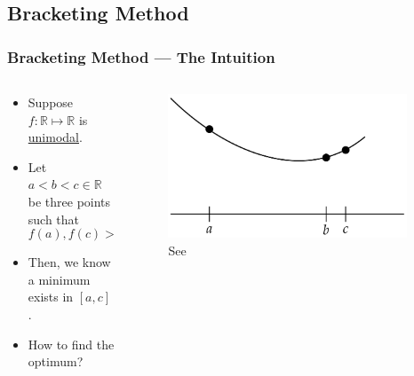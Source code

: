 \documentclass[11pt,xcolor={svgnames},aspectratio=169,usepdftitle=false]{beamer}
\begin{document}
\subsection{Bracketing Method}

\begin{frame}
  \frametitle{Bracketing Method --- The Intuition}
  \begin{columns}
  \begin{column}{0.49\textwidth}
    \begin{itemize}
      \item Suppose $f : \mathbb{R}\mapsto\mathbb{R}$ is \href{https://en.wikipedia.org/wiki/Unimodality\#Unimodal_function}{unimodal}.
      \item Let $a<b<c\in\mathbb{R}$ be three points such that
      \begin{equation}
        f(a), f(c) > f(b) \label{eqn:bracketing_criterion}
      \end{equation}
      \item Then, we know a minimum exists in $[a,c]$.
      \item How to find the optimum?
    \end{itemize}
  \end{column}
  \begin{column}{0.5\textwidth}
    \begin{figure}
      \includegraphics[width=0.95\textwidth]{../figures/optimization_bracketing.png}
      \caption{See \cite{kochenderfer2019optimization}}
    \end{figure}
  \end{column}
\end{columns}
\end{frame}
\end{document}

